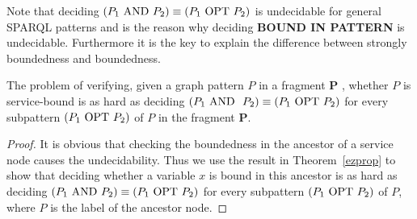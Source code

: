 Note that deciding $(P_1 \mbox{ AND } P_2) \equiv
(P_1 \mbox{ OPT }  P_2)$ is undecidable for general SPARQL patterns and is the reason
why deciding \textbf{BOUND IN PATTERN} is undecidable. Furthermore it is the key to explain
the difference between strongly boundedness and boundedness.

\begin{corollary}
	The problem of verifying, given a graph pattern $P$ in a fragment
	$\mathbf{P}$ , whether $P$ is
	service-bound is as hard as deciding $(P_1 \mbox{ AND } \ P_2) \equiv (P_1 \mbox{ OPT }
	P_2)$ for every subpattern $(P_1 \mbox{ OPT } P_2)$ of $P$ in the fragment
	$\mathbf{P}$.
\end{corollary}

\begin{proof}
	It is obvious that checking the boundedness in the ancestor of a service
	node causes the undecidability. Thus we use the result in Theorem~\ref{ezprop} to
	show that deciding whether a variable $x$ is bound in this ancestor is as
	hard as deciding $(P_1 \mbox{ AND } P_2)
	\equiv (P_1 \mbox{ OPT }  P_2)$ for every subpattern $(P_1 \mbox{ OPT } P_2)$ of $P$, where
	$P$ is the label of the ancestor node.
\end{proof}


